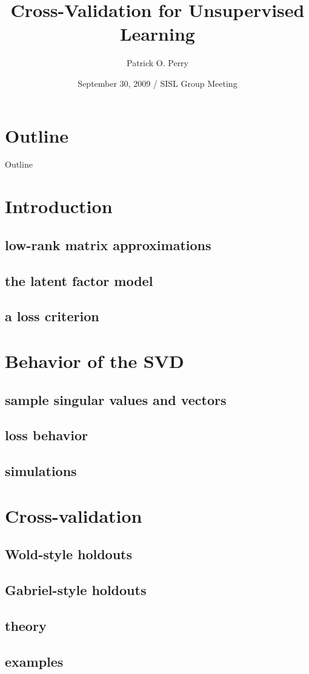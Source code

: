 \documentclass{beamer}
\title{Cross-Validation for Unsupervised Learning}
\author[P. O. Perry]{Patrick O. Perry}
\institute[Harvard University] 
{
  Statistics and Information Sciences Laboratory\\
  Harvard University
}
\date[SISL Group Meeting]
{September 30, 2009 / SISL Group Meeting}
\begin{document}
\begin{frame}
  \titlepage
\end{frame}

\section*{Outline}
\begin{frame}{Outline}
  \tableofcontents
\end{frame}


\section{Introduction}
\subsection{low-rank matrix approximations}
\subsection{the latent factor model}
\subsection{a loss criterion}

\section{Behavior of the SVD}
\subsection{sample singular values and vectors}
\subsection{loss behavior}
\subsection{simulations}

\section{Cross-validation}
\subsection{Wold-style holdouts}
\subsection{Gabriel-style holdouts}
\subsection{theory}
\subsection{examples}


\begin{frame}
\end{frame}
\end{document}
